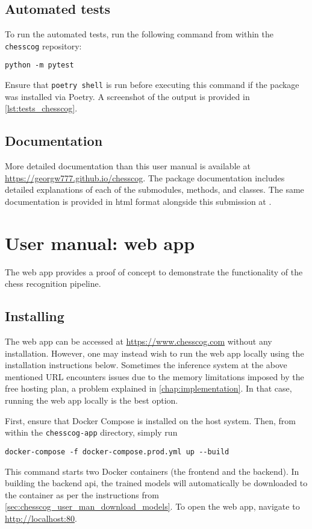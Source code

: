 \documentclass[../../report.tex]{subfiles}
\begin{document}
\section{Automated tests}
\label{sec:chesscog_tests}
To run the automated tests, run the following command from within the \texttt{chesscog} repository:
\begin{verbatim}
python -m pytest
\end{verbatim}
Ensure that \texttt{poetry shell} is run before executing this command if the package was installed via Poetry.
A screenshot of the output is provided in \cref{lst:tests_chesscog}.

\section{Documentation}
\label{sec:chesscog_documentation}
More detailed documentation than this user manual is available at \url{https://georgw777.github.io/chesscog}.
The package documentation includes detailed explanations of each of the submodules, methods, and classes.
The same documentation is provided in \gls{html} format alongside this submission at .

\chapter{User manual: web app}
\label{chap:user_man_chesscogapp}

The web app provides a proof of concept to demonstrate the functionality of the chess recognition pipeline.

\section{Installing}
The web app can be accessed at \url{https://www.chesscog.com} without any installation.
However, one may instead wish to run the web app locally using the installation instructions below.
Sometimes the inference system at the above mentioned URL encounters issues due to the memory limitations imposed by the free hosting plan, a problem explained in \cref{chap:implementation}.
In that case, running the web app locally is the best option.

First, ensure that Docker Compose is installed on the host system.
Then, from within the \texttt{chesscog-app} directory, simply run
\begin{verbatim}
docker-compose -f docker-compose.prod.yml up --build
\end{verbatim}
This command starts two Docker containers (the frontend and the backend).
In building the backend \gls{api}, the trained models will automatically be downloaded to the container as per the instructions from \cref{sec:chesscog_user_man_download_models}.
To open the web app, navigate to \url{http://localhost:80}.
\end{document}
